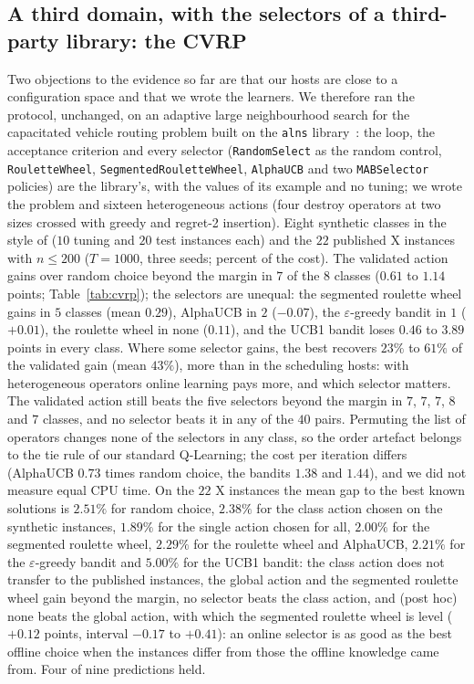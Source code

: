 

\subsection{A third domain, with the selectors of a third-party library: the CVRP}
\label{sec:cvrp}
Two objections to the evidence so far are that our hosts are close to a configuration space and that we wrote the learners. We therefore ran the protocol, unchanged, on an adaptive large neighbourhood search for the capacitated vehicle routing problem built on the \texttt{alns} library~\citep{WoudaLan2023}: the loop, the acceptance criterion and every selector (\texttt{RandomSelect} as the random control, \texttt{RouletteWheel}, \texttt{SegmentedRouletteWheel}, \texttt{AlphaUCB} and two \texttt{MABSelector} policies) are the library's, with the values of its example and no tuning; we wrote the problem and sixteen heterogeneous actions (four destroy operators at two sizes crossed with greedy and regret-2 insertion). Eight synthetic classes in the style of \citet{UchoaEtal2017} ($10$ tuning and $20$ test instances each) and the $22$ published X instances with $n\le200$ ($T=1000$, three seeds; percent of the cost). The validated action gains over random choice beyond the margin in $7$ of the $8$ classes ($0.61$ to $1.14$ points; Table~\ref{tab:cvrp}); the selectors are unequal: the segmented roulette wheel gains in $5$ classes (mean $0.29$), AlphaUCB in $2$ ($-0.07$), the $\varepsilon$-greedy bandit in $1$ ($+0.01$), the roulette wheel in none ($0.11$), and the UCB1 bandit loses $0.46$ to $3.89$ points in every class. Where some selector gains, the best recovers $23\%$ to $61\%$ of the validated gain (mean $43\%$), more than in the scheduling hosts: with heterogeneous operators online learning pays more, and which selector matters. The validated action still beats the five selectors beyond the margin in $7$, $7$, $7$, $8$ and $7$ classes, and no selector beats it in any of the $40$ pairs. Permuting the list of operators changes none of the selectors in any class, so the order artefact belongs to the tie rule of our standard Q-Learning; the cost per iteration differs (AlphaUCB $0.73$ times random choice, the bandits $1.38$ and $1.44$), and we did not measure equal CPU time. On the $22$ X instances the mean gap to the best known solutions is $2.51\%$ for random choice, $2.38\%$ for the class action chosen on the synthetic instances, $1.89\%$ for the single action chosen for all, $2.00\%$ for the segmented roulette wheel, $2.29\%$ for the roulette wheel and AlphaUCB, $2.21\%$ for the $\varepsilon$-greedy bandit and $5.00\%$ for the UCB1 bandit: the class action does not transfer to the published instances, the global action and the segmented roulette wheel gain beyond the margin, no selector beats the class action, and (post hoc) none beats the global action, with which the segmented roulette wheel is level ($+0.12$ points, interval $-0.17$ to $+0.41$): an online selector is as good as the best offline choice when the instances differ from those the offline knowledge came from. Four of nine predictions held.


